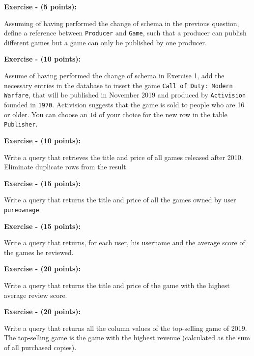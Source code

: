 \documentclass[10pt,a4paper]{article}
\newcounter{ExerciseCount}
\newcommand{\exercise}[2]{\noindent \textbf{Exercise \theExerciseCount \space - (#2 points):}
  
  \vspace{0.15cm}
  \noindent
 #1 \addtocounter{ExerciseCount}{1}
}
\begin{document}
\vspace{0.5cm}
\exercise{
Assuming of having performed the change of schema in the previous question, define a reference between \texttt{Producer} and \texttt{Game}, such that a producer can publish different games but a game can only be published by one producer.
}{5}

\vspace{0.5cm}
\exercise{
Assume of having performed the change of schema in Exercise 1, add the necessary entries in the database to insert the game \texttt{Call of Duty: Modern Warfare}, that will be published in November 2019 and produced by \texttt{Activision} founded in \texttt{1970}. Activision suggests that the game is sold to people who are 16 or older. You can choose an \texttt{Id} of your choice for the new row in the table \texttt{Publisher}.
}{10}

\vspace{0.5cm}
\exercise{
Write a query that retrieves the title and price of all games released after 2010. Eliminate duplicate rows from the result.
}{10}

\vspace{0.5cm}
\exercise{
Write a query that returns the title and price of all the games owned by user \texttt{pureownage}.
}{15}

\vspace{0.5cm}
\exercise{
Write a query that returns, for each user, his username and the average score of the games he reviewed.
}{15}

\vspace{0.5cm}
\exercise{
Write a query that returns the title and price of the game with the highest average review score.
}{20}

\vspace{0.5cm}
\exercise{
Write a query that returns all the column values of the top-selling game of 2019. The top-selling game is the game with the highest revenue (calculated as the sum of all purchased copies).
}{20}
\end{document}
